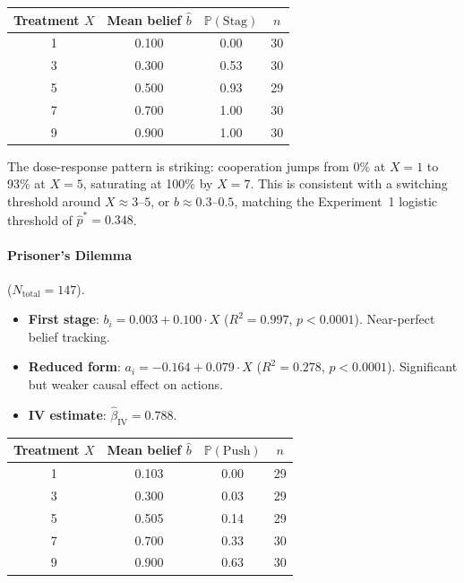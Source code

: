 \documentclass[12pt]{article}
\newcommand{\Prob}{\mathbb{P}}
\begin{document}
\begin{center}
\begin{tabular}{@{}cccc@{}}
\toprule
Treatment $X$ & Mean belief $\hat{b}$ & $\Prob(\text{Stag})$ & $n$ \\
\midrule
1 & 0.100 & 0.00 & 30 \\
3 & 0.300 & 0.53 & 30 \\
5 & 0.500 & 0.93 & 29 \\
7 & 0.700 & 1.00 & 30 \\
9 & 0.900 & 1.00 & 30 \\
\bottomrule
\end{tabular}
\end{center}

The dose-response pattern is striking: cooperation jumps from 0\% at $X=1$ to 93\% at $X=5$, saturating at 100\% by $X=7$. This is consistent with a switching threshold around $X \approx 3\text{--}5$, or $b \approx 0.3\text{--}0.5$, matching the Experiment~1 logistic threshold of $\hat{p}^*=0.348$.

\paragraph{Prisoner's Dilemma} ($N_{\text{total}}=147$).

\begin{itemize}[nosep]
    \item \textbf{First stage}: $b_i = 0.003 + 0.100 \cdot X$ ($R^2 = 0.997$, $p < 0.0001$). Near-perfect belief tracking.
    \item \textbf{Reduced form}: $a_i = -0.164 + 0.079 \cdot X$ ($R^2 = 0.278$, $p < 0.0001$). Significant but weaker causal effect on actions.
    \item \textbf{IV estimate}: $\hat\beta_{\text{IV}} = 0.788$.
\end{itemize}

\begin{center}
\begin{tabular}{@{}cccc@{}}
\toprule
Treatment $X$ & Mean belief $\hat{b}$ & $\Prob(\text{Push})$ & $n$ \\
\midrule
1 & 0.103 & 0.00 & 29 \\
3 & 0.300 & 0.03 & 29 \\
5 & 0.505 & 0.14 & 29 \\
7 & 0.700 & 0.33 & 30 \\
9 & 0.900 & 0.63 & 30 \\
\bottomrule
\end{tabular}
\end{center}
\end{document}
